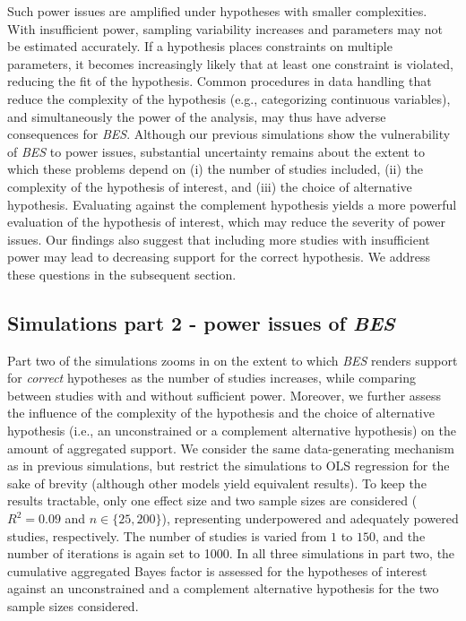 \documentclass[
]{article}
\begin{document}
Such power issues are amplified under hypotheses with smaller
complexities. With insufficient power, sampling variability increases
and parameters may not be estimated accurately. If a hypothesis places
constraints on multiple parameters, it becomes increasingly likely that
at least one constraint is violated, reducing the fit of the hypothesis.
Common procedures in data handling that reduce the complexity of the
hypothesis (e.g., categorizing continuous variables), and simultaneously
the power of the analysis, may thus have adverse consequences for
\emph{BES}. Although our previous simulations show the vulnerability of
\emph{BES} to power issues, substantial uncertainty remains about the
extent to which these problems depend on (i) the number of studies
included, (ii) the complexity of the hypothesis of interest, and (iii)
the choice of alternative hypothesis. Evaluating against the complement
hypothesis yields a more powerful evaluation of the hypothesis of
interest, which may reduce the severity of power issues. Our findings
also suggest that including more studies with insufficient power may
lead to decreasing support for the correct hypothesis. We address these
questions in the subsequent section.

\hypertarget{simulations-part-2---power-issues-of-bes}{%
\subsection{\texorpdfstring{Simulations part 2 - power issues of
\emph{BES}}{Simulations part 2 - power issues of BES}}\label{simulations-part-2---power-issues-of-bes}}

Part two of the simulations zooms in on the extent to which \emph{BES}
renders support for \emph{correct} hypotheses as the number of studies
increases, while comparing between studies with and without sufficient
power. Moreover, we further assess the influence of the complexity of
the hypothesis and the choice of alternative hypothesis (i.e., an
unconstrained or a complement alternative hypothesis) on the amount of
aggregated support. We consider the same data-generating mechanism as in
previous simulations, but restrict the simulations to OLS regression for
the sake of brevity (although other models yield equivalent results). To
keep the results tractable, only one effect size and two sample sizes
are considered (\(R^2 = 0.09\) and \(n \in \{25, 200\}\)), representing
underpowered and adequately powered studies, respectively. The number of
studies is varied from \(1\) to \(150\), and the number of iterations is
again set to 1000. In all three simulations in part two, the cumulative
aggregated Bayes factor is assessed for the hypotheses of interest
against an unconstrained and a complement alternative hypothesis for the
two sample sizes considered.
\end{document}
